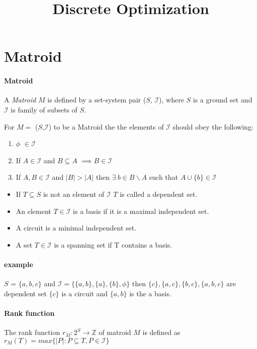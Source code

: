 \documentclass[options]{article}
\newcommand{\independentI}{\mathcal{I}}
\begin{document}
	\title{Discrete Optimization}
	\maketitle
\section{Matroid}
\paragraph{Matroid} A \emph{Matroid} $M$ is defined by a set-system pair ($S$,
$\mathcal{I}$), where $S$ is a ground set and $\mathcal{I}$ is family of subsets of $S$.

For $M =$ ($S$,$\mathcal{I}$) to be a Matroid the the elements of $\mathcal{I}$
should obey the following:
\begin{enumerate}
\item $\phi$ $\in \mathcal{I}$
\item If $A \in \mathcal{I}$ and $B \subseteq A$ $\implies B \in \mathcal{I}$
\item If $A, B \in \mathcal{I}$ and $|B| > |A|$ then $ \exists \ b \in B \backslash  A$   such that $A \cup \{ b \} \in \mathcal{I}$ 
\end{enumerate}
\begin{itemize}
\item If $ T \subseteq S$ is not an element of $\mathcal{I}$ $T$ is called a dependent set.
\item An element $T \in \mathcal{I}$ is a basis if it is a maximal independent set.
\item A circuit is a minimal independent set.
\item A set $T \in \mathcal{I}$  is a spanning set if T contains a basis. 
\end{itemize}
\paragraph{example} $S$ = $\{ a,b,c \}$ and $\independentI =\{ \{ a,b \},\{ a \}, \{ b \},\phi \}$ then $\{c \},\{a,c\},\{b,c\},\{a,b,c\}$ are dependent set  $\{c\}$ is a circuit and $\{ a,b\}$ is the a basis.
\paragraph{Rank function} The rank function $r_M : 2^S \rightarrow \mathbb{Z} $ of matroid $M$ is defined as $r_M (T) = max \{ |P|: P \subseteq T,P \in \independentI \}$
\end{document}
